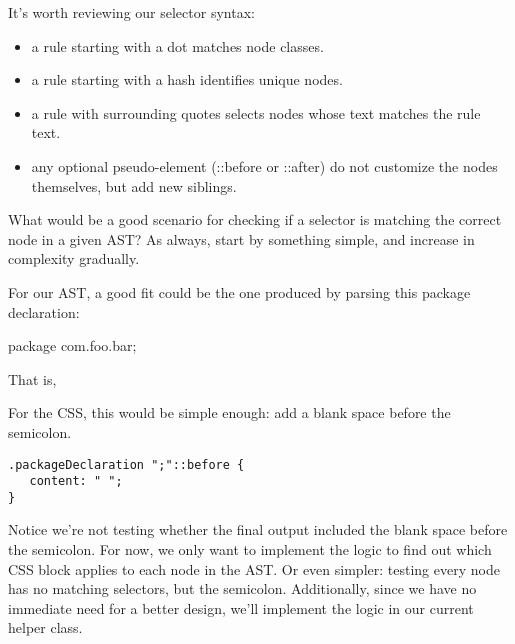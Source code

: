 \documentclass[11pt]{article}
\begin{document}
It's worth reviewing our selector syntax:

\begin{itemize}
\item a rule starting with a dot matches node classes.
\item a rule starting with a hash identifies unique nodes.
\item a rule with surrounding quotes selects nodes whose text matches the rule text.
\item any optional pseudo-element (::before or ::after) do not customize the nodes themselves, but add new siblings.
\end{itemize}

What would be a good scenario for checking if a selector is matching the correct node in a given AST? As always, start by
something simple, and increase in complexity gradually.

For our AST, a good fit could be the one produced by parsing this package declaration:

package com.foo.bar;

That is,

For the CSS, this would be simple enough: add a blank space before the semicolon.

\begin{verbatim}
.packageDeclaration ";"::before {
   content: " ";
}
\end{verbatim}

Notice we're not testing whether the final output included the blank space before the semicolon.
For now, we only want to implement the logic to find out which CSS block applies to each node in the AST. Or even simpler:
testing every node has no matching selectors, but the semicolon. Additionally, since we have no immediate need for a better
design, we'll implement the logic in our current helper class.
\end{document}
